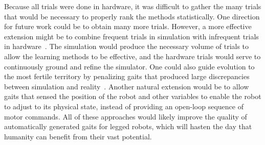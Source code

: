 
Because all trials were done in hardware, it was difficult to gather
the many trials that would be necessary to properly rank the methods statistically.
One direction for future work could be to obtain many more trials. However, a more effective extension might be to combine frequent trials in
simulation with infrequent trials in hardware~\citep{bongard}.  The simulation would produce the
necessary volume of trials to allow the learning methods to be
effective, and the hardware trials would serve to continuously ground
and refine the simulator.  One could also guide evolution to the most
fertile territory by penalizing gaits that produced large
discrepancies between simulation and reality~\citep{koos2010crossing}. Another natural extension would be to allow gaits that sensed the position of the robot and other variables to enable the robot to adjust to its physical state, instead of providing an open-loop sequence of motor commands. All of these approaches would likely improve the quality of automatically generated gaits for legged robots, which will hasten the day that humanity can benefit from their vast potential. 

